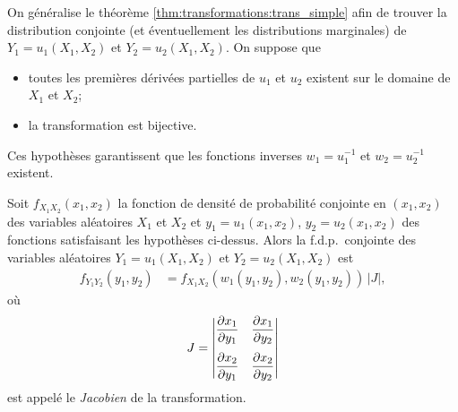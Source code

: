 On généralise le théorème \ref{thm:transformations:trans_simple} afin
de trouver la distribution conjointe (et éventuellement les
distributions marginales) de $Y_1 = u_1(X_1, X_2)$ et $Y_2 = u_2(X_1,
X_2)$. On suppose que
\begin{itemize}
\item toutes les premières dérivées partielles de $u_1$ et $u_2$
  existent sur le domaine de $X_1$ et $X_2$;
\item la transformation est bijective.
\end{itemize}
Ces hypothèses garantissent que les fonctions inverses $w_1 =
u_1^{-1}$ et $w_2 = u_2^{-1}$ existent.

\begin{thm}
  \label{thm:transformations:trans_multiple}
  Soit $f_{X_1 X_2}(x_1, x_2)$ la fonction de densité de probabilité
  con\-jointe en $(x_1, x_2)$ des variables aléatoires $X_1$ et $X_2$
  et $y_1 = u_1(x_1, x_2)$, $y_2 = u_2(x_1, x_2)$ des fonctions
  satisfaisant les hypothèses ci-dessus. Alors la f.d.p.\ conjointe
  des variables aléatoires $Y_1 = u_1(X_1, X_2)$ et $Y_2 = u_2(X_1,
  X_2)$ est
  \begin{align*}
    f_{Y_1 Y_2}(y_1, y_2)
    &= f_{X_1 X_2}(w_1(y_1, y_2), w_2(y_1, y_2))\, |J|,
  \end{align*}
  où
  \begin{displaymath}
    J =
    \begin{vmatrix}
      \displaystyle
      \frac{\partial x_1}{\partial y_1} &
      \displaystyle
      \frac{\partial x_1}{\partial y_2} \\[12pt]
      \displaystyle
      \frac{\partial x_2}{\partial y_1} &
      \displaystyle
      \frac{\partial x_2}{\partial y_2}
    \end{vmatrix}
  \end{displaymath}
  est appelé le \emph{Jacobien} de la transformation.
\end{thm}

